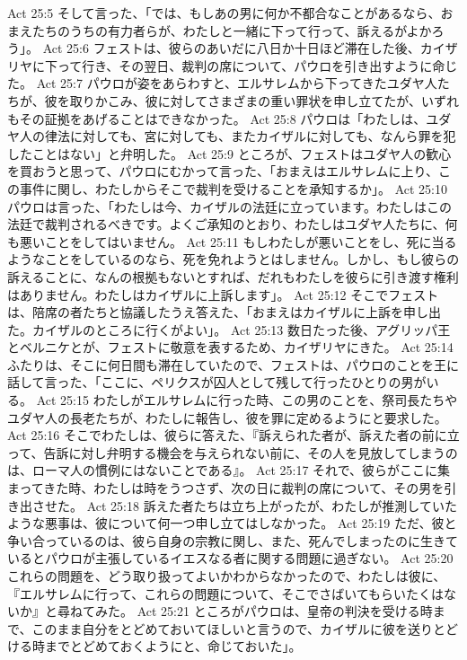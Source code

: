 Act 25:5  そして言った、「では、もしあの男に何か不都合なことがあるなら、おまえたちのうちの有力者らが、わたしと一緒に下って行って、訴えるがよかろう」。
Act 25:6  フェストは、彼らのあいだに八日か十日ほど滞在した後、カイザリヤに下って行き、その翌日、裁判の席について、パウロを引き出すように命じた。
Act 25:7  パウロが姿をあらわすと、エルサレムから下ってきたユダヤ人たちが、彼を取りかこみ、彼に対してさまざまの重い罪状を申し立てたが、いずれもその証拠をあげることはできなかった。
Act 25:8  パウロは「わたしは、ユダヤ人の律法に対しても、宮に対しても、またカイザルに対しても、なんら罪を犯したことはない」と弁明した。
Act 25:9  ところが、フェストはユダヤ人の歓心を買おうと思って、パウロにむかって言った、「おまえはエルサレムに上り、この事件に関し、わたしからそこで裁判を受けることを承知するか」。
Act 25:10  パウロは言った、「わたしは今、カイザルの法廷に立っています。わたしはこの法廷で裁判されるべきです。よくご承知のとおり、わたしはユダヤ人たちに、何も悪いことをしてはいません。
Act 25:11  もしわたしが悪いことをし、死に当るようなことをしているのなら、死を免れようとはしません。しかし、もし彼らの訴えることに、なんの根拠もないとすれば、だれもわたしを彼らに引き渡す権利はありません。わたしはカイザルに上訴します」。
Act 25:12  そこでフェストは、陪席の者たちと協議したうえ答えた、「おまえはカイザルに上訴を申し出た。カイザルのところに行くがよい」。
Act 25:13  数日たった後、アグリッパ王とベルニケとが、フェストに敬意を表するため、カイザリヤにきた。
Act 25:14  ふたりは、そこに何日間も滞在していたので、フェストは、パウロのことを王に話して言った、「ここに、ペリクスが囚人として残して行ったひとりの男がいる。
Act 25:15  わたしがエルサレムに行った時、この男のことを、祭司長たちやユダヤ人の長老たちが、わたしに報告し、彼を罪に定めるようにと要求した。
Act 25:16  そこでわたしは、彼らに答えた、『訴えられた者が、訴えた者の前に立って、告訴に対し弁明する機会を与えられない前に、その人を見放してしまうのは、ローマ人の慣例にはないことである』。
Act 25:17  それで、彼らがここに集まってきた時、わたしは時をうつさず、次の日に裁判の席について、その男を引き出させた。
Act 25:18  訴えた者たちは立ち上がったが、わたしが推測していたような悪事は、彼について何一つ申し立てはしなかった。
Act 25:19  ただ、彼と争い合っているのは、彼ら自身の宗教に関し、また、死んでしまったのに生きているとパウロが主張しているイエスなる者に関する問題に過ぎない。
Act 25:20  これらの問題を、どう取り扱ってよいかわからなかったので、わたしは彼に、『エルサレムに行って、これらの問題について、そこでさばいてもらいたくはないか』と尋ねてみた。
Act 25:21  ところがパウロは、皇帝の判決を受ける時まで、このまま自分をとどめておいてほしいと言うので、カイザルに彼を送りとどける時までとどめておくようにと、命じておいた」。
